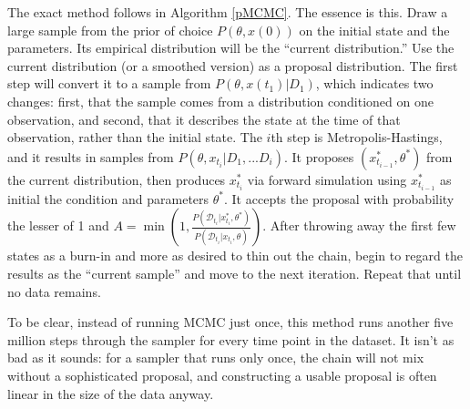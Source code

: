 \documentclass{article}
\begin{document}
The exact method follows in Algorithm \ref{pMCMC}. The essence is this. Draw a large sample from the prior of choice $P(\theta, x(0))$ on the initial state and the parameters. Its empirical distribution will be the ``current distribution.'' Use the current distribution (or a smoothed version) as a proposal distribution. The first step will convert it to a sample from $P(\theta, x(t_1)|D_1)$, which indicates two changes: first, that the sample comes from a distribution conditioned on one observation, and second, that it describes the state at the time of that observation, rather than the initial state. The $i$th step is Metropolis-Hastings, and it results in samples from $P(\theta, x_{t_i}|D_{1}, ...D_{i})$. It proposes $(x_{t_{i-1}}^*, \theta^*)$ from the current distribution, then produces $x_{t_{i}}^*$ via forward simulation using $x_{t_{i-1}}^*$ as initial the condition and parameters $\theta^*$. It accepts the proposal with probability the lesser of 1 and $A=\min(1, \frac{P(\mathcal{D}_{t_{i}}|x_{t_{i}}^*, \theta^*)}{P(\mathcal{D}_{t_{i}}|x_{t_{i}}, \theta)})$. After throwing away the first few states as a burn-in and more as desired to thin out the chain, begin to regard the results as the ``current sample'' and move to the next iteration. Repeat that until no data remains.

To be clear, instead of running MCMC just once, this method runs another five million steps through the sampler for every time point in the dataset. It isn’t as bad as it sounds: for a sampler that runs only once, the chain will not mix without a sophisticated proposal, and constructing a usable proposal is often linear in the size of the data anyway.
\end{document}
